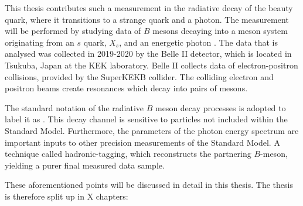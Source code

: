 This thesis contributes such a measurement in the radiative decay of the beauty quark, where it transitions to a strange quark and a photon.
The measurement will be performed by studying data of $B$ mesons decaying into a meson system originating from an $s$ quark, $X_s$, and an energetic photon \g.
The data that is analysed was collected in 2019-2020 by the Belle II detector, which is located in Tsukuba, Japan at the KEK laboratory.
Belle II collects data of electron-positron collisions, provided by the SuperKEKB collider.
The colliding electron and positron beams create \FourS resonances which decay into pairs of \B mesons.

The standard notation of the radiative $B$ meson decay processes is adopted to label it as \BtoXsgamma.
This decay channel is sensitive to particles not included within the Standard Model. 
Furthermore, the parameters of the photon energy spectrum are important inputs to other precision measurements of the Standard Model.
A technique called hadronic-tagging, which reconstructs the partnering $B$-meson, yielding a purer final measured data sample.


These aforementioned points will be discussed in detail in this thesis.
The thesis is therefore split up in X chapters:

